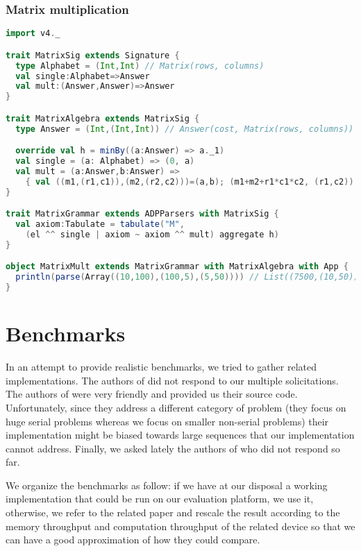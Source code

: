 \subsubsection{Matrix multiplication} \label{ex_matmult}
\begin{lstlisting}[language=Scala,caption={Matrix Multiplication}]
import v4._

trait MatrixSig extends Signature {
  type Alphabet = (Int,Int) // Matrix(rows, columns)
  val single:Alphabet=>Answer
  val mult:(Answer,Answer)=>Answer
}

trait MatrixAlgebra extends MatrixSig {
  type Answer = (Int,(Int,Int)) // Answer(cost, Matrix(rows, columns))

  override val h = minBy((a:Answer) => a._1)
  val single = (a: Alphabet) => (0, a)
  val mult = (a:Answer,b:Answer) =>
    { val ((m1,(r1,c1)),(m2,(r2,c2)))=(a,b); (m1+m2+r1*c1*c2, (r1,c2)) }
}

trait MatrixGrammar extends ADPParsers with MatrixSig {
  val axiom:Tabulate = tabulate("M",
    (el ^^ single | axiom ~ axiom ^^ mult) aggregate h)
}

object MatrixMult extends MatrixGrammar with MatrixAlgebra with App {
  println(parse(Array((10,100),(100,5),(5,50)))) // List((7500,(10,50)))
}
\end{lstlisting}




\section{Benchmarks} \label{benchmarks}
In an attempt to provide realistic benchmarks, we tried to gather related implementations. The authors of \cite{gpu_atlp} did not respond to our multiple solicitations. The authors of \cite{swat_mega} were very friendly and provided us their source code. Unfortunately, since they address a different category of problem (they focus on huge serial problems whereas we focus on smaller non-serial problems) their implementation might be biased towards large sequences that our implementation cannot address. Finally, we asked lately the authors of \cite{gpu_rnafold} {\color{red} who did not respond so far}.

We organize the benchmarks as follow: if we have at our disposal a working implementation that could be run on our evaluation platform, we use it, otherwise, we refer to the related paper and rescale the result according to the memory throughput and computation throughput of the related device so that we can have a good approximation of how they could compare.

